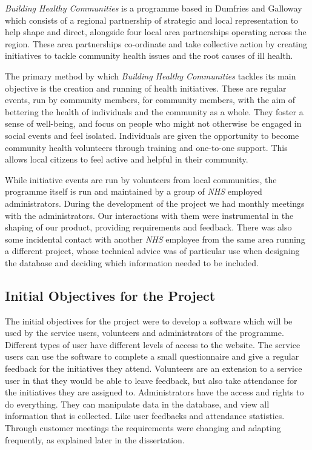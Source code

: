 \documentclass{l3proj}
\begin{document}
\textit{Building Healthy Communities} is a programme based in Dumfries and Galloway which consists of a regional partnership of strategic and local representation to help shape and direct, alongside four local area partnerships operating across the region. These area partnerships co-ordinate and take collective action by creating initiatives to tackle community health issues and the root causes of ill health.

The primary method by which \textit{Building Healthy Communities} tackles its main objective is the creation and running of health initiatives. These are regular events, run by community members, for community members, with the aim of bettering the health of individuals and the community as a whole. They foster a sense of well-being, and focus on people who might not otherwise be engaged in social events and feel isolated. Individuals are given the opportunity to become community health volunteers through training and one-to-one support. This allows local citizens to feel active and helpful in their community.

While initiative events are run by volunteers from local communities, the programme itself is run and maintained by a group of \textit{NHS} employed administrators. During the development of the project we had monthly meetings with the administrators. Our interactions with them were instrumental in the shaping of our product, providing requirements and feedback. There was also some incidental contact with another \textit{NHS} employee from the same area running a different project, whose technical advice was of particular use when designing the database and deciding which information needed to be included.

\subsection{Initial Objectives for the Project}
\label{sec:initial-objectives}

The initial objectives for the project were to develop a software which will be used by the service users, volunteers and administrators of the programme. Different types of user have different levels of access to the website. The service users can use the software to complete a small questionnaire and give a regular feedback for the initiatives they attend. Volunteers are an extension to a service user in that they would be able to leave feedback, but also take attendance for the initiatives they are assigned to. Administrators have the access and rights to do everything. They can manipulate data in the database, and view all information that is collected. Like user feedbacks and attendance statistics. Through customer meetings the requirements were changing and adapting frequently, as explained later in the dissertation.
\end{document}
